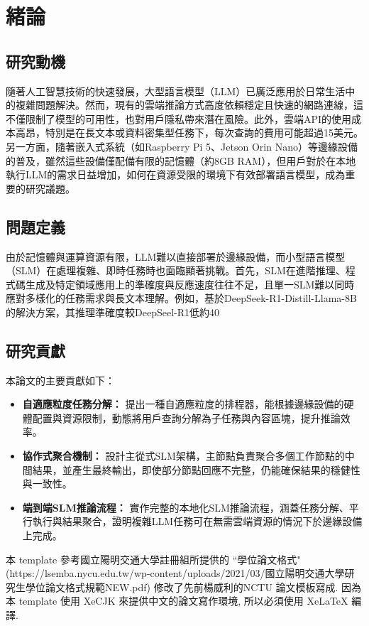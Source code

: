 \chapter{緒論}

\section{研究動機}
隨著人工智慧技術的快速發展，大型語言模型（LLM）已廣泛應用於日常生活中的複雜問題解決。然而，現有的雲端推論方式高度依賴穩定且快速的網路連線，這不僅限制了模型的可用性，也對用戶隱私帶來潛在風險。此外，雲端API的使用成本高昂，特別是在長文本或資料密集型任務下，每次查詢的費用可能超過15美元。另一方面，隨著嵌入式系統（如Raspberry Pi 5、Jetson Orin Nano）等邊緣設備的普及，雖然這些設備僅配備有限的記憶體（約8GB RAM），但用戶對於在本地執行LLM的需求日益增加，如何在資源受限的環境下有效部署語言模型，成為重要的研究議題。

\section{問題定義}
由於記憶體與運算資源有限，LLM難以直接部署於邊緣設備，而小型語言模型（SLM）在處理複雜、即時任務時也面臨顯著挑戰。首先，SLM在進階推理、程式碼生成及特定領域應用上的準確度與反應速度往往不足，且單一SLM難以同時應對多樣化的任務需求與長文本理解。例如，基於DeepSeek-R1-Distill-Llama-8B的解決方案，其推理準確度較DeepSeel-R1低約40%

\section{研究貢獻}
本論文的主要貢獻如下：
\begin{itemize}
    \item \textbf{自適應粒度任務分解：} 提出一種自適應粒度的排程器，能根據邊緣設備的硬體配置與資源限制，動態將用戶查詢分解為子任務與內容區塊，提升推論效率。
    \item \textbf{協作式聚合機制：} 設計主從式SLM架構，主節點負責聚合多個工作節點的中間結果，並產生最終輸出，即使部分節點回應不完整，仍能確保結果的穩健性與一致性。
    \item \textbf{端到端SLM推論流程：} 實作完整的本地化SLM推論流程，涵蓋任務分解、平行執行與結果聚合，證明複雜LLM任務可在無需雲端資源的情況下於邊緣設備上完成。
\end{itemize}

本 template 參考國立陽明交通大學註冊組所提供的 ``學位論文格式" (https://lsemba.nycu.edu.tw/wp-content/uploads/2021/03/國立陽明交通大學研究生學位論文格式規範NEW.pdf) 修改了先前楊威利的NCTU 論文模板寫成.
因為本 template 使用 XeCJK 來提供中文的論文寫作環境, 所以必須使用 XeLaTeX 編譯.

